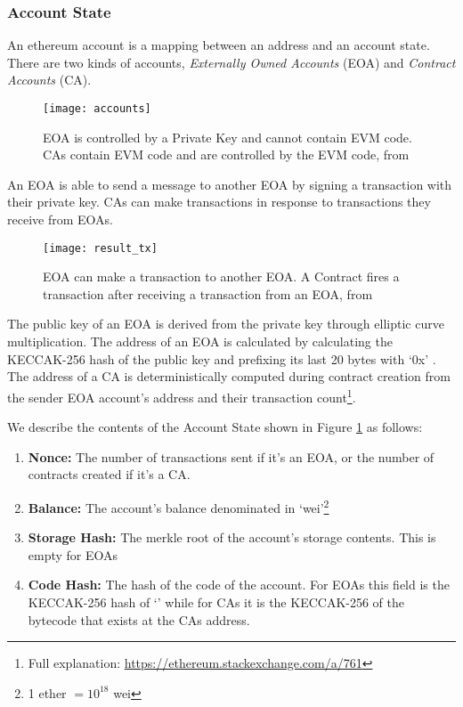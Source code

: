 \subsubsection{Account State}
An ethereum account is a mapping between an address and an account state. There are two kinds of accounts, \textit{Externally Owned Accounts} (EOA) and \textit{Contract Accounts} (CA).

\begin{figure}[H]
    \centering
    \texttt{[image: accounts]}
    \caption{EOA is controlled by a Private Key and cannot contain EVM code. CAs contain EVM code and are controlled by the EVM code, from \cite{visual}}
    \label{fig:accounts}
\end{figure}

An EOA is able to send a message to another EOA by signing a transaction with their private key. CAs can make transactions in response to transactions they receive from EOAs. 

\begin{figure}[H]
    \centering
    \texttt{[image: result\_tx]}
    \caption{EOA can make a transaction to another EOA. A Contract fires a transaction after receiving a transaction from an EOA, from \cite{preethi}}
    \label{fig:tx_accounts}
\end{figure}

The public key of an EOA is derived from the private key through elliptic curve multiplication. The address of an EOA is calculated by calculating the KECCAK-256 hash of the public key and prefixing its last 20 bytes with `0x' \cite{ethereum}. The address of a CA is deterministically computed during contract creation from the sender EOA account's address and their transaction count\footnote{Full explanation: \url{https://ethereum.stackexchange.com/a/761}}.

We describe the contents of the Account State shown in Figure \ref{fig:accounts} as follows:
\begin{enumerate}
    \item \textbf{Nonce:} The number of transactions sent if it's an EOA, or the number of contracts created if it's a CA.
    \item \textbf{Balance:} The account's balance denominated in `wei'\footnote{1 ether $= 10^{18}$ wei }
    \item \textbf{Storage Hash:} The merkle root of the account's storage contents. This is empty for EOAs
    \item \textbf{Code Hash:} The hash of the code of the account. For EOAs this field is the KECCAK-256 hash of `' while for CAs it is the KECCAK-256 of the bytecode that exists at the CAs address.
\end{enumerate}

